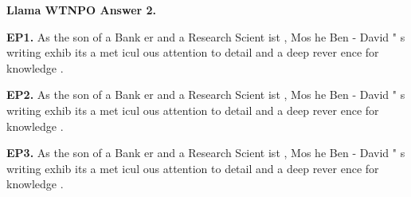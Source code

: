 \begin{mdframed}\small
\textbf{Llama WTNPO Answer 2.} 

\textbf{EP1.} \textcolor{Gray2}{As} \textcolor{Gray9}{the} \textcolor{Gray8}{son} \textcolor{Gray9}{of} \textcolor{Gray9}{a} \textcolor{Gray6}{Bank} \textcolor{Gray6}{er} \textcolor{Gray9}{and} \textcolor{Gray8}{a} \textcolor{Gray5}{Research} \textcolor{Gray8}{Scient} \textcolor{Gray9}{ist} \textcolor{Gray9}{,} \textcolor{Gray6}{Mos} \textcolor{Gray9}{he} \textcolor{Gray9}{Ben} \textcolor{Gray9}{-} \textcolor{Gray5}{David} \textcolor{Gray8}{"} \textcolor{Gray9}{s} \textcolor{Gray6}{writing} \textcolor{Gray3}{exhib} \textcolor{Gray9}{its} \textcolor{Gray9}{a} \textcolor{Gray4}{met} \textcolor{Gray9}{icul} \textcolor{Gray9}{ous} \textcolor{Gray4}{attention} \textcolor{Gray9}{to} \textcolor{Gray9}{detail} \textcolor{Gray8}{and} \textcolor{Gray9}{a} \textcolor{Gray7}{deep} \textcolor{Gray8}{rever} \textcolor{Gray9}{ence} \textcolor{Gray9}{for} \textcolor{Gray9}{knowledge} \textcolor{Gray7}{.} 

\textbf{EP2.} \textcolor{Gray1}{As} \textcolor{Gray7}{the} \textcolor{Gray8}{son} \textcolor{Gray9}{of} \textcolor{Gray9}{a} \textcolor{Gray3}{Bank} \textcolor{Gray6}{er} \textcolor{Gray9}{and} \textcolor{Gray5}{a} \textcolor{Gray3}{Research} \textcolor{Gray8}{Scient} \textcolor{Gray9}{ist} \textcolor{Gray9}{,} \textcolor{Gray5}{Mos} \textcolor{Gray9}{he} \textcolor{Gray8}{Ben} \textcolor{Gray9}{-} \textcolor{Gray6}{David} \textcolor{Gray6}{"} \textcolor{Gray9}{s} \textcolor{Gray5}{writing} \textcolor{Gray2}{exhib} \textcolor{Gray9}{its} \textcolor{Gray7}{a} \textcolor{Gray3}{met} \textcolor{Gray9}{icul} \textcolor{Gray9}{ous} \textcolor{Gray3}{attention} \textcolor{Gray9}{to} \textcolor{Gray9}{detail} \textcolor{Gray6}{and} \textcolor{Gray8}{a} \textcolor{Gray4}{deep} \textcolor{Gray7}{rever} \textcolor{Gray9}{ence} \textcolor{Gray9}{for} \textcolor{Gray8}{knowledge} \textcolor{Gray5}{.} 

\textbf{EP3.} \textcolor{Gray0}{As} \textcolor{Gray0}{the} \textcolor{Gray0}{son} \textcolor{Gray4}{of} \textcolor{Gray1}{a} \textcolor{Gray0}{Bank} \textcolor{Gray1}{er} \textcolor{Gray1}{and} \textcolor{Gray0}{a} \textcolor{Gray0}{Research} \textcolor{Gray2}{Scient} \textcolor{Gray7}{ist} \textcolor{Gray2}{,} \textcolor{Gray0}{Mos} \textcolor{Gray4}{he} \textcolor{Gray1}{Ben} \textcolor{Gray3}{-} \textcolor{Gray2}{David} \textcolor{Gray0}{"} \textcolor{Gray3}{s} \textcolor{Gray0}{writing} \textcolor{Gray0}{exhib} \textcolor{Gray6}{its} \textcolor{Gray1}{a} \textcolor{Gray0}{met} \textcolor{Gray8}{icul} \textcolor{Gray2}{ous} \textcolor{Gray0}{attention} \textcolor{Gray5}{to} \textcolor{Gray4}{detail} \textcolor{Gray1}{and} \textcolor{Gray1}{a} \textcolor{Gray0}{deep} \textcolor{Gray2}{rever} \textcolor{Gray5}{ence} \textcolor{Gray4}{for} \textcolor{Gray2}{knowledge} \textcolor{Gray0}{.} 


\end{mdframed}
